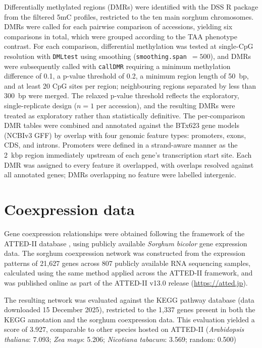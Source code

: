 \hspace{1em}Differentially methylated regions (DMRs) were identified with the DSS R package \cite{fengDifferentialMethylationAnalysis2019} from the filtered 5mC profiles, restricted to the ten main sorghum chromosomes. DMRs were called for each pairwise comparison of accessions, yielding six comparisons in total, which were grouped according to the TAA phenotype contrast. For each comparison, differential methylation was tested at single-CpG resolution with \texttt{DMLtest} using smoothing (\texttt{smoothing.span}~$=500$), and DMRs were subsequently called with \texttt{callDMR} requiring a minimum methylation difference of 0.1, a p-value threshold of 0.2, a minimum region length of 50~bp, and at least 20 CpG sites per region; neighbouring regions separated by less than 300~bp were merged. The relaxed p-value threshold reflects the exploratory, single-replicate design ($n=1$ per accession), and the resulting DMRs were treated as exploratory rather than statistically definitive. The per-comparison DMR tables were combined and annotated against the BTx623 gene models (NCBIv3 GFF) by overlap with four genomic feature types: promoters, exons, CDS, and introns. Promoters were defined in a strand-aware manner as the 2~kbp region immediately upstream of each gene's transcription start site. Each DMR was assigned to every feature it overlapped, with overlaps resolved against all annotated genes; DMRs overlapping no feature were labelled intergenic.

\section{Coexpression data}
\hspace{1em} Gene coexpression relationships were obtained following the framework of the ATTED-II database \cite{obayashiATTEDIIV11Plant2022}, using publicly available \textit{Sorghum bicolor} gene expression data. The sorghum coexpression network was constructed from the expression patterns of 21,627 genes across 807 publicly available RNA sequencing samples, calculated using the same method applied across the ATTED-II framework, and was published online as part of the ATTED-II v13.0 release (\url{https://atted.jp}).

\hspace{1em}The resulting network was evaluated against the KEGG pathway database (data downloaded 15 December 2025), restricted to the 1{,}337 genes present in both the KEGG annotation and the sorghum coexpression data. This evaluation yielded a score of 3.927, comparable to other species hosted on ATTED-II (\textit{Arabidopsis thaliana}: 7.093; \textit{Zea mays}: 5.206; \textit{Nicotiana tabacum}: 3.569; random: 0.500)


